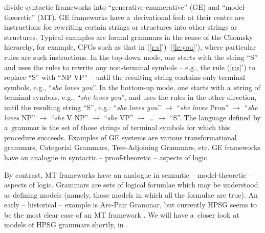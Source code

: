 \documentclass[output=paper,hidelinks]{langscibook}
\begin{document}
\citet{pullum2001distinction} divide syntactic frameworks into “generative\hyp{}enumerative” (GE\@) and “model\hyp{}theoretic” (MT\@).  GE frameworks have a~derivational feel: at their centre are instructions for rewriting certain strings or structures into other strings or structures.  Typical examples are formal grammars in the sense of the Chomsky hierarchy, for example, CFGs such as that in (\ref{r:s}$'$)--(\ref{le:you}$'$), where particular rules are such instructions.  In the top-down mode, one starts with the string “S” and uses the rules to rewrite any non-terminal symbols -- e.g., the rule (\ref{r:s}$'$) to replace “S” with “NP VP” -- until the resulting string contains only terminal symbols, e.g., “\emph{she} \emph{loves} \emph{you}”.  In the bottom-up mode, one starts with a~string of terminal symbols, e.g., “\emph{she} \emph{loves} \emph{you}”, and uses the rules in the other direction, until the resulting string “S”, e.g.: “\emph{she} \emph{loves} \emph{you}” $\rightarrow$ “\emph{she} \emph{loves} Pron” $\rightarrow$ “\emph{she} \emph{loves} NP” $\rightarrow$ “\emph{she} V NP” $\rightarrow$ “\emph{she} VP” $\rightarrow$ … $\rightarrow$ “S”.  The language defined by a~grammar is the set of those strings of terminal symbols for which this procedure succeeds. Examples of GE systems are various transformational grammars, Categorial Grammars, Tree\hyp{}Adjoining Grammars, etc.  GE frameworks have an analogue in syntactic -- proof\hyp{}theoretic -- aspects of logic.

By contrast, MT frameworks have an analogue in semantic -- model\hyp{}theoretic -- aspects of logic.  Grammars are sets of logical formulae which may be understood as defining models (namely, those models in which all the formulae are true).  An early -- historical -- example is Arc-Pair Grammar, but currently HPSG seems to be the most clear case of an MT framework \citep[60]{pullum2019what}.  We will have a~closer look at models of HPSG grammars shortly, in .
\end{document}
